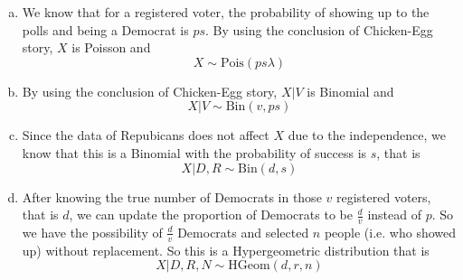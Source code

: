 \documentclass[10.5pt]{article}
\begin{document}
\begin{enumerate}[(a)]
	\item We know that for a registered voter, the probability of showing up to the polls and being a Democrat is $ps$.
	By using the conclusion of Chicken-Egg story, $X$ is Poisson and $$X\sim \text{Pois}(ps\lambda)$$\vspace{0.4cm}
	\item By using the conclusion of Chicken-Egg story, $X|V$ is Binomial and $$X|V\sim \text{Bin}(v, ps)$$\vspace{0.4cm}
	\item Since the data of Repubicans does not affect $X$ due to the independence, we know that this is a Binomial with the probability of success is $s$,
	that is $$X|D, R  \sim \text{Bin}(d, s)$$\vspace{0.4cm}
	\item After knowing the true number of Democrats in those $v$ registered voters, that is $d$, we can update the proportion of Democrats to be $\frac{d}{v}$ instead of $p$.
	So we have the possibility of $\frac{d}{v}$ Democrats and selected $n$ people (i.e. who showed up) without replacement. So this is a Hypergeometric distribution that is $$X|D, R, N\sim\text{HGeom}(d, r, n)$$
\end{enumerate}
\end{document}
